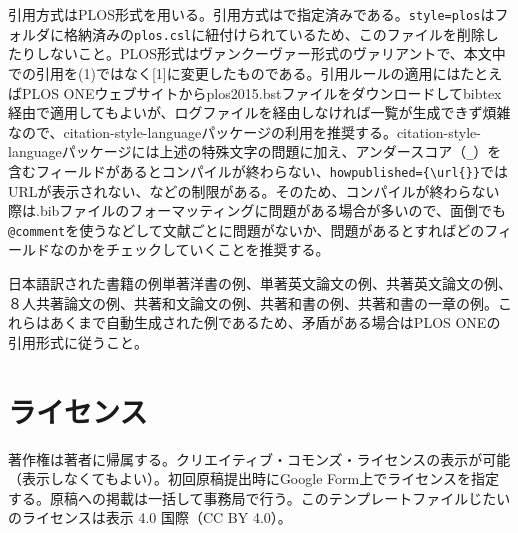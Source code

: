 \documentclass[fontsize=9pt, jafontscale=.95, twocolumn, a4paper]{jlreq}
\begin{document}
引用方式はPLOS形式を用いる。引用方式は\texttt{}で指定済みである。\verb|style=plos|はフォルダに格納済みの\verb|plos.csl|に紐付けられているため、このファイルを削除したりしないこと。PLOS形式はヴァンクーヴァー形式のヴァリアントで、本文中での引用を(1)ではなく[1]に変更したものである。引用ルールの適用にはたとえばPLOS ONEウェブサイト\cite{Plos_undated-wc}からplos2015.bstファイルをダウンロードしてbibtex経由で適用してもよいが、ログファイルを経由しなければ一覧が生成できず煩雑なので、citation-style-languageパッケージの利用を推奨する。citation-style-languageパッケージには上述の特殊文字の問題に加え、アンダースコア（\verb|_|）を含むフィールドがあるとコンパイルが終わらない、\verb|howpublished={\url{}}|ではURLが表示されない、などの制限がある。そのため、コンパイルが終わらない際は.bibファイルのフォーマッティングに問題がある場合が多いので、面倒でも\texttt{@comment{}}を使うなどして文献ごとに問題がないか、問題があるとすればどのフィールドなのかをチェックしていくことを推奨する。

日本語訳された書籍の例\cite{Henrich2019-yk}単著洋書の例\cite{Dawkins2006-fw, Dennett2017-xz}、単著英文論文の例\cite{Tehrani2013-dy}、共著英文論文の例\cite{Henrich2008-lq}、８人共著論文の例\cite{Cooney2017-yt}、共著和文論文の例\cite{2012-zr}、共著和書の例\cite{2012-dp}、共著和書の一章の例\cite{2017-dc}。これらはあくまで自動生成された例であるため、矛盾がある場合はPLOS ONEの引用形式\cite{Plos_undated-yh}に従うこと。

\section{ライセンス}
著作権は著者に帰属する。クリエイティブ・コモンズ・ライセンスの表示が可能（表示しなくてもよい）。初回原稿提出時にGoogle Form上でライセンスを指定する。原稿への掲載は一括して事務局で行う。このテンプレートファイルじたいのライセンスは表示 4.0 国際（CC BY 4.0）\cite{Creative_Commons_undated-dl}。

\printbibliography
\end{document}
